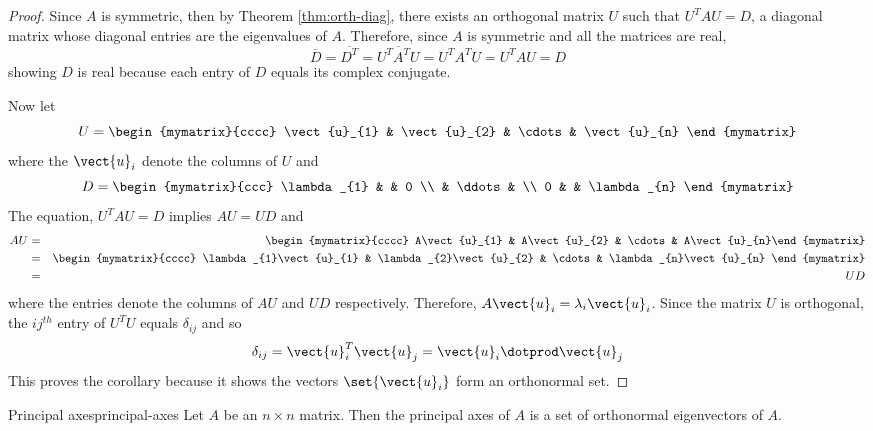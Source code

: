 \begin{proof}
Since $A$ is symmetric, then by Theorem \ref{thm:orth-diag},
there exists an orthogonal matrix $U$ such that $U^{T}AU=D$, a diagonal
matrix whose diagonal entries are the eigenvalues of $A$. Therefore, since $
A $ is symmetric and all the matrices are real, 
\begin{equation*}
\overline{D}=\overline{D^{T}}=\overline{U^{T}A^{T}U}=U^{T}A^{T}U=U^{T}AU=D
\end{equation*}
showing $D$ is real because each entry of $D$ equals its complex conjugate.

Now let 
\begin{equation*}
U=\begin{mymatrix}{cccc}
\vect{u}_{1} & \vect{u}_{2} & \cdots & \vect{u}_{n}
\end{mymatrix}
\end{equation*}
where the $\vect{u}_{i}$ denote the columns of $U$ and 
\begin{equation*}
D=\begin{mymatrix}{ccc}
\lambda _{1} &  & 0 \\ 
& \ddots &  \\ 
0 &  & \lambda _{n}
\end{mymatrix}
\end{equation*}
The equation, $U^{T}AU=D$ implies $AU = UD$ and 
\begin{eqnarray*}
AU &=&\begin{mymatrix}{cccc}
A\vect{u}_{1} & A\vect{u}_{2} & \cdots & A\vect{u}_{n}%
\end{mymatrix} \\
&=&\begin{mymatrix}{cccc}
\lambda _{1}\vect{u}_{1} & \lambda _{2}\vect{u}_{2} & \cdots & \lambda
_{n}\vect{u}_{n}
\end{mymatrix} \\
&=& UD
\end{eqnarray*}
where the entries denote the columns of $AU$ and $UD$ respectively.
Therefore, $A\vect{u}_{i}=\lambda _{i}\vect{u}_{i}$.  Since the matrix $U$
is orthogonal, the $ij^{th}$ entry of $U^{T}U$ equals $\delta _{ij}$ and so 
\begin{equation*}
\delta _{ij}=\vect{u}_{i}^{T}\vect{u}_{j}=\vect{u}_{i}\dotprod \vect{u}
_{j}
\end{equation*}
This proves the corollary because it shows the vectors $\set{\vect{u}
_{i}} $ form an orthonormal set.
\end{proof}

\begin{definition}{Principal axes}{principal-axes}
Let $A$ be an $n \times n$ matrix. Then the principal axes of $A$ is a set of orthonormal eigenvectors of $A$.
\end{definition}

